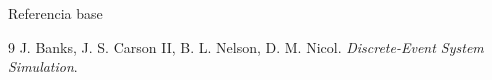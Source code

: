 \documentclass[aspectratio=1610, 9pt]{beamer}
\begin{document}
\begin{frame}{Referencia base}
\small
\begin{thebibliography}{9}
J. Banks, J. S. Carson II, B. L. Nelson, D. M. Nicol.
\newblock \emph{Discrete-Event System Simulation}.

\end{thebibliography}
\end{frame}
\end{document}
